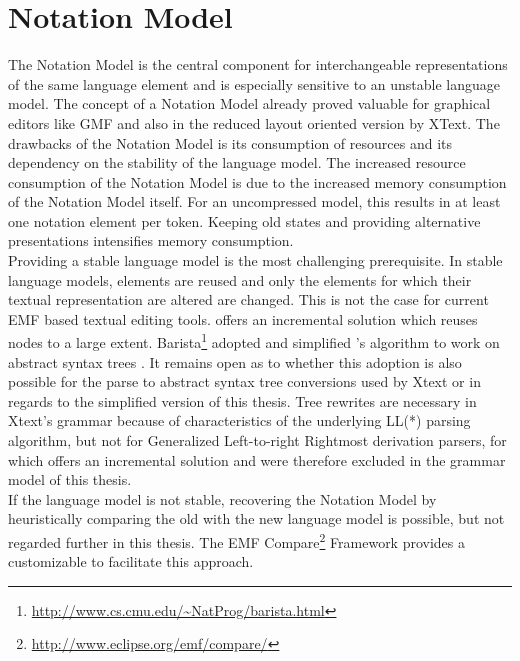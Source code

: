 \section{Notation Model} The Notation Model is the central component for interchangeable representations of the same language element and is especially sensitive to an unstable language model. The concept of a Notation Model already proved valuable for graphical editors like GMF and also in the reduced layout oriented version by XText. The drawbacks of the Notation Model is its consumption of resources and its dependency on the stability of the language model. The increased resource consumption of the Notation Model is due to the increased memory consumption of the Notation Model itself. For an uncompressed model, this results in at least one notation element per token. Keeping old states and providing alternative presentations intensifies memory consumption. \\ %
Providing a stable language model is the most challenging prerequisite. In stable language models, elements are reused and only the elements for which their textual representation are altered are changed. This is not the case for current EMF based textual editing tools. \cite{iSW} offers an incremental solution which reuses nodes to a large extent. Barista\footnote{\raggedright \url{http://www.cs.cmu.edu/~NatProg/barista.html}} adopted and simplified \cite{iSW}'s algorithm to work on abstract syntax trees \cite{Barista}. It remains open as to whether this adoption is also possible for the parse to abstract syntax tree conversions used by Xtext or in regards to the simplified version of this thesis. Tree rewrites are necessary in Xtext's grammar because of characteristics of the underlying LL(*) parsing algorithm, but not for Generalized Left-to-right Rightmost derivation parsers, for which \cite{iSW} offers an incremental solution and were therefore excluded in the grammar model of this thesis. \\%
If the language model is not stable, recovering the Notation Model by heuristically comparing the old with the new language model is possible, but not regarded further in this thesis. The EMF Compare\footnote{\raggedright \url{http://www.eclipse.org/emf/compare/}} Framework provides a customizable  to facilitate this approach. \\
